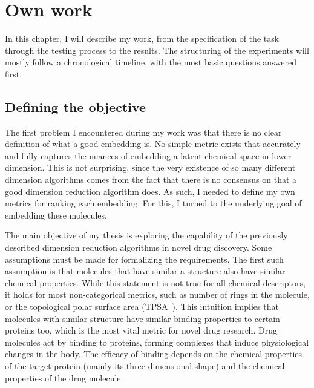 \chapter{Own work}\label{ch:own-work}

In this chapter, I will describe my work, from the specification of the task through the testing process to the results. The structuring of the experiments will mostly follow a chronological timeline, with the most basic questions answered first.

\section{Defining the objective}\label{sec:defining-the-objective}

The first problem I encountered during my work was that there is no clear definition of what a good embedding is. No simple metric exists that accurately and fully captures the nuances of embedding a latent chemical space in lower dimension. This is not surprising, since the very existence of so many different dimension algorithms comes from the fact that there is no consensus on that a good dimension reduction algorithm does. As such, I needed to define my own metrics for ranking each embedding. For this, I turned to the underlying goal of embedding these molecules.

The main objective of my thesis is exploring the capability of the previously described dimension reduction algorithms in novel drug discovery. Some assumptions must be made for formalizing the requirements. The first such assumption is that molecules that have similar a structure also have similar chemical properties. While this statement is not true for all chemical descriptors, it holds for most non-categorical metrics, such as number of rings in the molecule, or the topological polar surface area (TPSA~\cite{bib:tpsa}). This intuition implies that molecules with similar structure have similar binding properties to certain proteins too, which is the most vital metric for novel drug research. Drug molecules act by binding to proteins, forming complexes that induce physiological changes in the body. The efficacy of binding depends on the chemical properties of the target protein (mainly its three-dimensional shape) and the chemical properties of the drug molecule.

